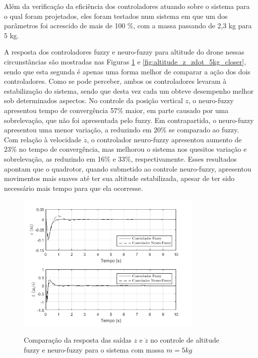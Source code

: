 Além da verificação da eficiência dos controladores atuando sobre o sistema para o qual foram projetados, eles foram testados num sistema em que um dos parâmetros foi acrescido de mais de 100 \%, com a massa passando de 2,3 kg para 5 kg.

A resposta dos controladores fuzzy e neuro-fuzzy para altitude do drone nessas circunstâncias são mostradas nas Figuras \ref{fig:altitude_z_zdot_5kg} e \ref{fig:altitude_z_zdot_5kg_closer}, sendo que esta segunda é apenas uma forma melhor de comparar a ação dos dois controladores. Como se pode perceber, ambos os controladores levaram à estabilização do sistema, sendo que desta vez cada um obteve desempenho melhor sob determinados aspectos. No controle da posição vertical $z$, o neuro-fuzzy apresentou tempo de convergência 57\% maior, em parte causado por uma sobrelevação, que não foi apresentada pelo fuzzy. Em contrapartida, o neuro-fuzzy apresentou uma menor variação, a reduzindo em 20\% se comparado ao fuzzy. Com relação à velocidade $\dot{z}$, o controlador neuro-fuzzy apresentou aumento de 23\% no tempo de convergência, mas melhorou o sistema nos quesitos variação e sobrelevação, as reduzindo em 16\% e 33\%, respectivamente. Esses resultados apontam que o quadrotor, quando submetido ao controle neuro-fuzzy, apresentou movimentos mais suaves até ter sua altitude estabilizada, apesar de ter sido necessário mais tempo para que ela ocorresse.


\begin{figure}[!htb]
    \centering
    \caption{Comparação da resposta das saídas $z$ e $\dot{z}$ no controle de altitude fuzzy e neuro-fuzzy para o sistema com massa $m=5kg$}
    \includegraphics[width=0.8\textwidth]{./04-figuras/resultados/novos/altitude_z_zdot_5kg}
    \label{fig:altitude_z_zdot_5kg}
\end{figure}

